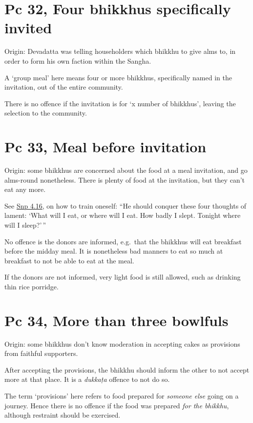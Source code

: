 \section{Pc 32, Four bhikkhus specifically invited}

Origin: Devadatta was telling householders which bhikkhu to give alms
to, in order to form his own faction within the Sangha.

A `group meal' here means four or more bhikkhus, specifically named in
the invitation, out of the entire community.

There is no offence if the invitation is for `x number of bhikkhus',
leaving the selection to the community.

\section{Pc 33, Meal before invitation}

Origin: some bhikkhus are concerned about the food at a meal invitation,
and go alms-round nonetheless. There is plenty of food at the
invitation, but they can't eat any more.

See
\href{https://www.accesstoinsight.org/tipitaka/kn/snp/snp.4.16.than.html}{Snp
4.16}, on how to train oneself: ``He should conquer these four thoughts
of lament: `What will I eat, or where will I eat. How badly I slept.
Tonight where will I sleep?'\,''

No offence is the donors are informed, e.g.~that the bhikkhus will eat
breakfast before the midday meal. It is nonetheless bad manners to eat
so much at breakfast to not be able to eat at the meal.

If the donors are not informed, very light food is still allowed, such
as drinking thin rice porridge.

\section{Pc 34, More than three bowlfuls}

Origin: some bhikkhus don't know moderation in accepting cakes as
provisions from faithful supporters.

After accepting the provisions, the bhikkhu should inform the other to
not accept more at that place. It is a \emph{dukkaṭa} offence to not do
so.

The term `provisions' here refers to food prepared for \emph{someone
else} going on a journey. Hence there is no offence if the food was
prepared \emph{for the bhikkhu}, although restraint should be exercised.

